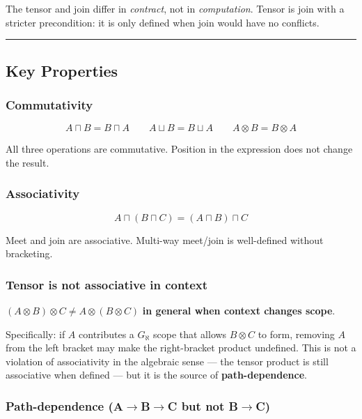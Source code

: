 \documentclass[12pt,a4paper]{article}
\begin{document}
The tensor and join differ in \emph{contract}, not in \emph{computation}. Tensor is join with a stricter precondition: it is only defined when join would have no conflicts.

\begin{center}
\rule{0.5\textwidth}{0.4pt}
\end{center}

\subsection{Key Properties}

\subsubsection{Commutativity}

\[A \sqcap B = B \sqcap A \qquad A \sqcup B = B \sqcup A \qquad A \otimes B = B \otimes A\]

All three operations are commutative. Position in the expression does not change the result.

\subsubsection{Associativity}

\[A \sqcap (B \sqcap C) = (A \sqcap B) \sqcap C\]

Meet and join are associative. Multi-way meet/join is well-defined without bracketing.

\subsubsection{Tensor is \textbf{not} associative in context}

$(A \otimes B) \otimes C \neq A \otimes (B \otimes C)$ \textbf{in general when context changes scope}.

Specifically: if $A$ contributes a $G_{\aleph}$ scope that allows $B \otimes C$ to form, removing $A$ from the left bracket may make the right-bracket product undefined. This is not a violation of associativity in the algebraic sense --- the tensor product is still associative when defined --- but it is the source of \textbf{path-dependence}.

\subsubsection{Path-dependence (A$\rightarrow$B$\rightarrow$C but not B$\rightarrow$C)}
\end{document}
